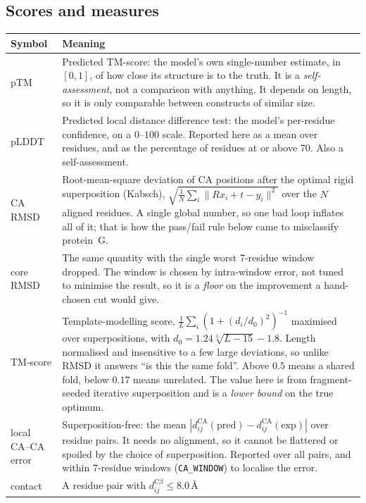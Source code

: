 \documentclass[11pt,a4paper]{article}
\newcommand{\ang}{\,\mbox{\AA}}
\newcommand{\ptm}{\mathrm{pTM}}
\newcommand{\plddt}{pLDDT}
\begin{document}
\subsection{Scores and measures}

\begin{center}
\small
\begin{tabular}{@{}lp{11.4cm}@{}}
\toprule
Symbol & Meaning \\
\midrule
$\ptm$ & Predicted TM-score: the model's own single-number estimate, in
  $[0,1]$, of how close its structure is to the truth. It is a
  \emph{self-assessment}, not a comparison with anything. It depends on
  length, so it is only comparable between constructs of similar size. \\
\plddt{} & Predicted local distance difference test: the model's per-residue
  confidence, on a $0$--$100$ scale. Reported here as a mean over residues, and
  as the percentage of residues at or above 70. Also a self-assessment. \\
CA RMSD & Root-mean-square deviation of CA positions after the optimal rigid
  superposition (Kabsch), $\sqrt{\frac{1}{N}\sum_i \lVert R x_i + t - y_i
  \rVert^2}$ over the $N$ aligned residues. A single global number, so one bad
  loop inflates all of it; that is how the pass/fail rule below came to
  misclassify protein~G. \\
core RMSD & The same quantity with the single worst 7-residue window dropped.
  The window is chosen by intra-window error, not tuned to minimise the result,
  so it is a \emph{floor} on the improvement a hand-chosen cut would give. \\
TM-score & Template-modelling score, $\frac{1}{L}\sum_i (1 + (d_i/d_0)^2)^{-1}$
  maximised over superpositions, with $d_0 = 1.24\sqrt[3]{L-15} - 1.8$. Length
  normalised and insensitive to a few large deviations, so unlike RMSD it
  answers ``is this the same fold''. Above $0.5$ means a shared fold, below
  $0.17$ means unrelated. The value here is from fragment-seeded iterative
  superposition and is a \emph{lower bound} on the true optimum. \\
local CA--CA error & Superposition-free: the mean $|d^{\mathrm{CA}}_{ij}
  (\text{pred}) - d^{\mathrm{CA}}_{ij}(\text{exp})|$ over residue pairs. It needs
  no alignment, so it cannot be flattered or spoiled by the choice of
  superposition. Reported over all pairs, and within 7-residue windows
  (\texttt{CA\_WINDOW}) to localise the error. \\
contact & A residue pair with $d^{\mathrm{C}\beta}_{ij} \le 8.0\ang$

\end{tabular}
\end{center}
\end{document}
